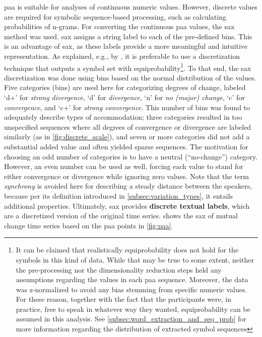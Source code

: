 \Ac{paa} is suitable for analyses of continuous numeric values.
However, discrete values are required for symbolic sequence-based processing, such as calculating probabilities of n-grams.
For converting the continuous \ac{paa} values, the \acl{sax} \citep[\acs{sax};][]{Lin2007experiencing} method was used.
\Ac{sax} assigns a string label to each of the pre-defined bins.
This is an advantage of \ac{sax}, as these labels provide a more meaningful and intuitive representation.
As explained, e.g., by \citet{Apostolico2003monotony}, it is preferable to use a discretization technique that outputs a symbol set with equiprobability\footnote{It can be claimed that realistically equiprobability does not hold for the symbols in this kind of data.
While that may be true to some extent, neither the pre-processing nor the dimensionality reduction steps held any assumptions regarding the values in each \ac{paa} sequence.
Moreover, the data was z-normalized to avoid any bias stemming from specific numeric values.
For these reason, together with the fact that the participants were, in practice, free to speak in whatever way they wanted, equiprobability can be assumed in this analysis.
See \cref{subsec:word_extraction_and_seq_prob} for more information regarding the distribution of extracted symbol sequences}.
To that end, the \ac{sax} discretization was done using bins based on the normal distribution of the values.
Five categories (bins) are used here for categorizing degrees of change, labeled \enquote*{d+} for \emph{strong divergence}, \enquote*{d} for \emph{divergence}, \enquote*{n} for \emph{no (major) change}, \enquote*{c} for \emph{convergence}, and \enquote*{c+} for \emph{strong convergence}.
This number of bins was found to adequately describe types of accommodation;
three categories resulted in too unspecified sequences where all degrees of convergence or divergence are labeled similarly (as in \cref{fig:discrete_scale}), and seven or more categories did not add a substantial added value and often yielded sparse sequences.
The motivation for choosing an odd number of categories is to have a neutral (\enquote{no-change}) category.
However, an even number can be used as well, forcing each value to stand for either convergence or divergence while ignoring zero values.
Note that the term \emph{synchrony} is avoided here for describing a steady distance between the speakers, because per its definition introduced in \cref{subsec:variation_types}, it entails additional properties.
Ultimately, \ac{sax} provides \textbf{discrete textual labels}, which are a discretized version of the original time series.
 shows the \ac{sax} of mutual change time series based on the \ac{paa} points in \cref{fig:paa}.

